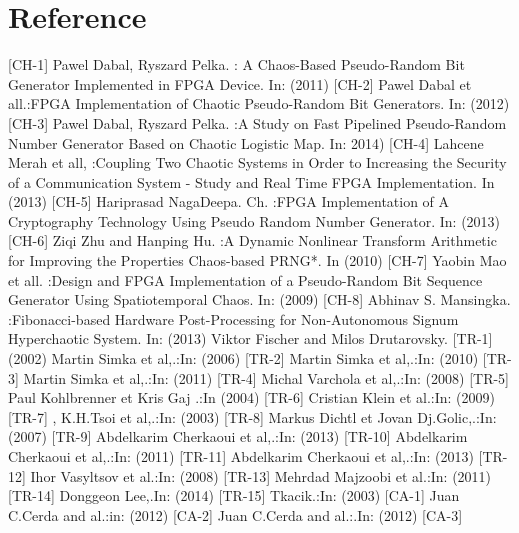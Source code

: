 \documentclass[English, runningheads,a4paper]{llncs}
\begin{document}
\section{Reference}
\begin{thebibliography}{4}

 [CH-1] Pawel Dabal, Ryszard Pelka. : A Chaos-Based Pseudo-Random Bit Generator Implemented in FPGA Device. In: (2011)
[CH-2] Pawel Dabal et all.:FPGA Implementation of Chaotic Pseudo-Random Bit Generators. In: (2012)
[CH-3] Pawel Dabal, Ryszard Pelka. :A Study on Fast Pipelined Pseudo-Random Number Generator Based on Chaotic Logistic Map. In: 2014)  
[CH-4] Lahcene Merah et all, :Coupling Two Chaotic Systems in Order to Increasing the Security of a Communication System - Study and Real Time FPGA Implementation. In (2013) 
[CH-5] Hariprasad  NagaDeepa. Ch. :FPGA Implementation of A Cryptography Technology Using Pseudo Random Number Generator. In: (2013)   
[CH-6] Ziqi Zhu and Hanping Hu. :A Dynamic Nonlinear Transform Arithmetic for Improving the Properties Chaos-based PRNG*. In (2010) 
[CH-7] Yaobin Mao et all. :Design and FPGA Implementation of a Pseudo-Random Bit  Sequence Generator Using Spatiotemporal Chaos. In: (2009)
[CH-8] Abhinav S. Mansingka. :Fibonacci-based Hardware Post-Processing for Non-Autonomous Signum Hyperchaotic System. In: (2013)
Viktor Fischer and Milos Drutarovsky. [TR-1]  (2002)
Martin Simka et al,.:In: (2006) [TR-2] 
Martin Simka et al,.:In: (2010) [TR-3]  
Martin Simka et al,.:In: (2011) [TR-4] 
Michal Varchola et al,.:In: (2008) [TR-5] 
Paul Kohlbrenner et Kris Gaj .:In  (2004) [TR-6] 
Cristian Klein et al.:In: (2009) [TR-7] ,
K.H.Tsoi et al,.:In: (2003) [TR-8] 
Markus Dichtl et Jovan Dj.Golic,.:In: (2007) [TR-9] 
Abdelkarim Cherkaoui et al,.:In: (2013) [TR-10]
Abdelkarim Cherkaoui et al,.:In: (2011) [TR-11]
Abdelkarim Cherkaoui et al,.:In: (2013) [TR-12] 
Ihor Vasyltsov et al.:In: (2008) [TR-13] 
Mehrdad Majzoobi et al.:In: (2011) [TR-14] 
Donggeon Lee,.In: (2014) [TR-15]
Tkacik.:In: (2003) [CA-1] 
Juan C.Cerda and al.:in: (2012) [CA-2] 
Juan C.Cerda and al.:.In: (2012) [CA-3] 

\end{thebibliography}
\end{document}
